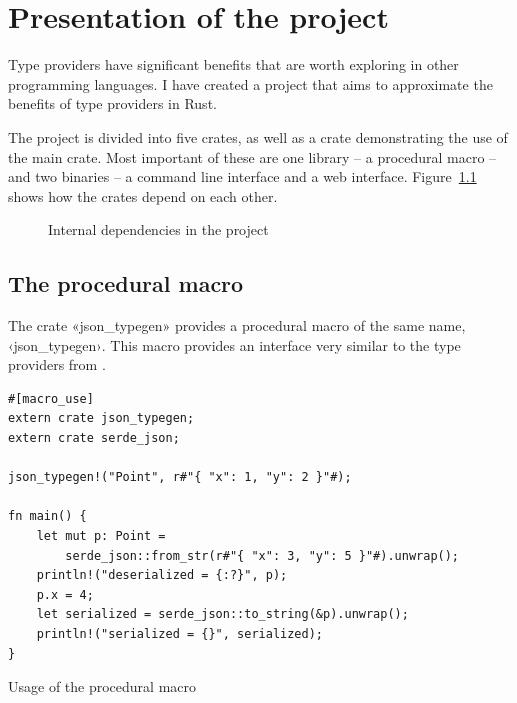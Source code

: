 
\chapter{Presentation of the project}

Type providers have significant benefits that are worth exploring in other programming languages. I have created a project that aims to approximate the benefits of type providers in Rust.

The project is divided into five crates, as well as a crate demonstrating the use of the main crate. Most important of these are one library -- a procedural macro -- and two binaries -- a command line interface and a web interface. Figure~\ref{fig:crates} shows how the crates depend on each other.

\begin{figure}[ht!]
\vspace{2mm}
\centering
{}
\vspace{2mm}
\caption{Internal dependencies in the project}
\label{fig:crates}
\end{figure}

\section{The procedural macro}

The crate «json_typegen» provides a procedural macro of the same name, ‹json_typegen›. This macro provides an interface very similar to the type providers from \fsharpdata.

\begin{listing}[ht!]
\begin{verbatim}
#[macro_use]
extern crate json_typegen;
extern crate serde_json;

json_typegen!("Point", r#"{ "x": 1, "y": 2 }"#);

fn main() {
    let mut p: Point =
        serde_json::from_str(r#"{ "x": 3, "y": 5 }"#).unwrap();
    println!("deserialized = {:?}", p);
    p.x = 4;
    let serialized = serde_json::to_string(&p).unwrap();
    println!("serialized = {}", serialized);
}
\end{verbatim}
\caption{Usage of the procedural macro}
\label{lst:proc-macro-example}
\end{listing}

